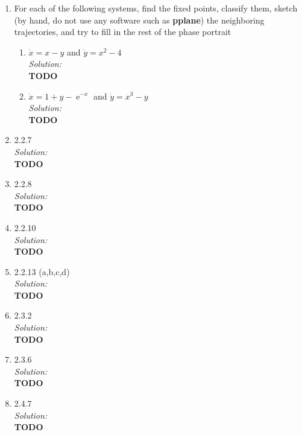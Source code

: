 \documentclass[10pt]{amsart}
\DeclareMathOperator{\E}{e}
\theoremstyle{nonumberplain}
\begin{document}
\begin{enumerate}[label={\bf {\arabic*}:}]
\item For each of the following systems, find the fixed points, classify them, sketch (by hand, do not use any software such as \textbf{pplane}) the neighboring trajectories, and try to fill in the rest of the phase portrait \\

\begin{enumerate}
\item $\dot x = x - y$ and $\dot y = x^2 -4$ \\
\textit{Solution:} \\
\textbf{TODO} \\

\item $\dot x = 1 + y - \E^{-x}$ and $\dot y = x^3 -y$ \\
\textit{Solution:} \\
\textbf{TODO} \\
\end{enumerate}

\item 2.2.7 \\
\textit{Solution:} \\
\textbf{TODO} \\

\item 2.2.8 \\
\textit{Solution:} \\
\textbf{TODO} \\

\item 2.2.10 \\
\textit{Solution:} \\
\textbf{TODO} \\

\item 2.2.13 (a,b,c,d) \\
\textit{Solution:} \\
\textbf{TODO} \\

\item 2.3.2 \\
\textit{Solution:} \\
\textbf{TODO} \\

\item 2.3.6 \\
\textit{Solution:} \\
\textbf{TODO} \\

\item 2.4.7 \\
\textit{Solution:} \\
\textbf{TODO} \\

\end{enumerate}
\end{document}
